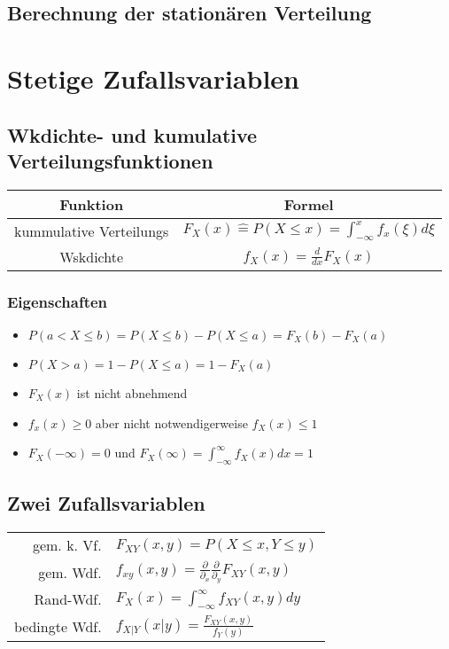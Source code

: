 \documentclass{article}
\begin{document}
\subsection{Berechnung der stationären Verteilung}


\section{Stetige Zufallsvariablen}
\subsection{Wkdichte- und kumulative Verteilungsfunktionen}
\begin{tabular}{c | c}
Funktion & Formel \\ \hline
kummulative Verteilungs& $F_X (x) \hat{=}  P(X \leq x ) = \int_{-\infty}^x f_x(\xi)d\xi $ \\
Wskdichte  &$f_X(x) = \frac{d}{dx} F_X(x)$\\
\end{tabular}

\subsubsection{Eigenschaften}
\begin{itemize}
\item $P(a < X \leq b) = P(X\le b) - P(X \le a) = F_X (b) - F_X(a)$
\item $P(X > a) = 1-P(X \le a) = 1- F_X(a)$
\item $F_X(x) $ ist nicht abnehmend
\item$ f_x(x) \ge 0 $ aber nicht notwendigerweise $f_X(x) \leq 1$
 \item $F_X (-\infty) = 0$ und $ F_X(\infty) = \int_{-\infty}^\infty f_X(x) dx =1$
\end{itemize}

\subsection{Zwei Zufallsvariablen}
\begin{tabular}{r l}

gem. k. Vf.& $F_{XY} (x,y) = P(X \leq x, Y\leq y)$\\
gem. Wdf. & $f_{xy}(x,y) = \frac{\partial}{\partial_x} \frac{\partial}{\partial_y} F_{XY}(x,y)$\\
Rand-Wdf. & $F_X(x) = \int_{-\infty}^\infty f_{XY}(x,y) dy$\\
bedingte Wdf. & $f_{X|Y}(x|y) = \frac{F_{XY}(x,y)}{f_Y(y)}$\\

\end{tabular}
\end{document}
